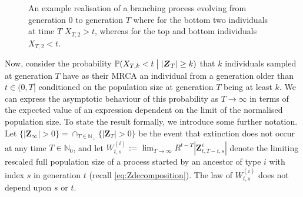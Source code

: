 \documentclass[preprint,3p,12pt]{elsarticle}
\theoremstyle{definition}
\begin{document}
\begin{figure}
\vspace{0.2cm}
\caption{An example realisation of a branching process evolving from generation $0$ to generation $T$ where for the bottom two individuals at time $T$ $X_{T, 2} > t$, whereas for the top and bottom individuals $X_{T, 2} < t$.}
\label{fig:branching}
\end{figure}

Now, consider the probability $\mathbb{P}(X_{T,k} < t \bigm| |\boldsymbol{Z}_T|\ge k)$ that $k$ individuals sampled at generation $T$ have as their MRCA an individual from a generation older than $t \in (0, T]$ conditioned on the population size at generation $T$ being at least $k$. We can express the asymptotic behaviour of this probability as $T\to\infty$ in terms of the expected value of an expression dependent on the limit of the normalised population size. To state the result formally, we introduce some further notation. Let $\{|\boldsymbol{Z}_{\infty}| > 0\} = \cap_{T\in\mathbb{N}_+} \{|\boldsymbol{Z}_T| > 0\}$ be the event that extinction does not occur at any time $T \in \mathbb{N}_0$, and let $W^{(i)}_{t,s}:= \lim_{T\rightarrow \infty} R^{t-T}|\boldsymbol{Z}^i_{t, T-t, s}| $ denote the limiting rescaled full population size of a process started by an ancestor of type $i$ with index $s$ in generation $t$ (recall \eqref{eq:Zdecomposition}). The law of $W^{(i)}_{t,s}$ does not depend upon $s$ or $t$. 
\end{document}
